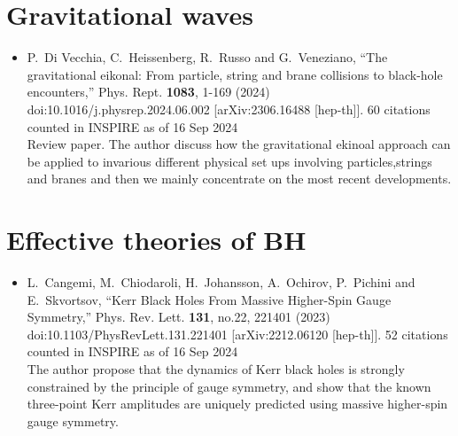\documentclass[a4paper,12pt]{article}
\begin{document}
\section*{Gravitational waves}
\begin{itemize}
    \item %
    P.~Di Vecchia, C.~Heissenberg, R.~Russo and G.~Veneziano,
    ``The gravitational eikonal: From particle, string and brane collisions to black-hole encounters,''
    Phys. Rept. \textbf{1083}, 1-169 (2024)
    doi:10.1016/j.physrep.2024.06.002
    [arXiv:2306.16488 [hep-th]].
    60 citations counted in INSPIRE as of 16 Sep 2024\\
    Review paper. The author discuss how the gravitational ekinoal approach can be applied to invarious different physical
    set ups involving particles,strings and branes and then we mainly concentrate on the most recent
    developments.
    
\end{itemize}
\section*{Effective theories of BH}
\begin{itemize}
    \item %
    L.~Cangemi, M.~Chiodaroli, H.~Johansson, A.~Ochirov, P.~Pichini and E.~Skvortsov,
    ``Kerr Black Holes From Massive Higher-Spin Gauge Symmetry,''
    Phys. Rev. Lett. \textbf{131}, no.22, 221401 (2023)
    doi:10.1103/PhysRevLett.131.221401
    [arXiv:2212.06120 [hep-th]].
    52 citations counted in INSPIRE as of 16 Sep 2024\\
    The author propose that the dynamics of Kerr black holes is strongly constrained by the principle of
    gauge symmetry, and show that the known three-point Kerr amplitudes are uniquely
    predicted using massive higher-spin gauge symmetry.
\end{itemize}
\end{document}
